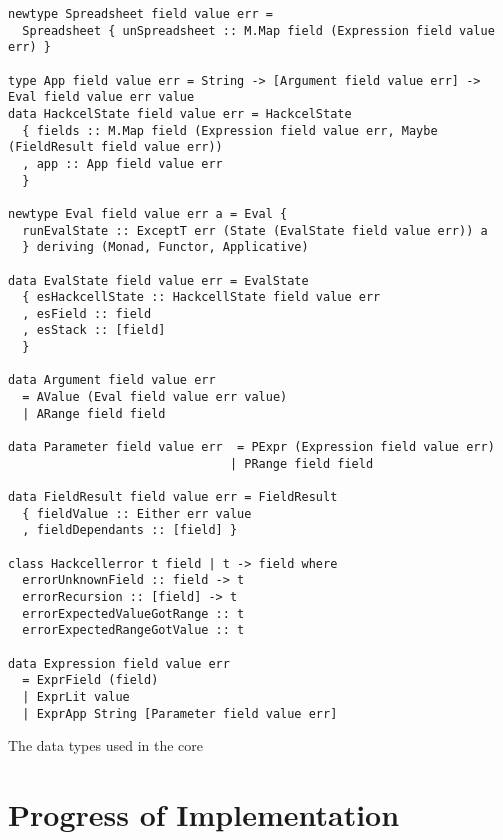 \documentclass{article}
\begin{document}
	\begin{listing}
	\begin{verbatim}
newtype Spreadsheet field value err =
  Spreadsheet { unSpreadsheet :: M.Map field (Expression field value err) }
     
type App field value err = String -> [Argument field value err] -> Eval field value err value
data HackcelState field value err = HackcelState
  { fields :: M.Map field (Expression field value err, Maybe (FieldResult field value err))
  , app :: App field value err
  }

newtype Eval field value err a = Eval {
  runEvalState :: ExceptT err (State (EvalState field value err)) a
  } deriving (Monad, Functor, Applicative)

data EvalState field value err = EvalState
  { esHackcellState :: HackcellState field value err
  , esField :: field
  , esStack :: [field]
  }

data Argument field value err
  = AValue (Eval field value err value)
  | ARange field field

data Parameter field value err  = PExpr (Expression field value err)
                               | PRange field field
                               
data FieldResult field value err = FieldResult
  { fieldValue :: Either err value
  , fieldDependants :: [field] }

class Hackcellerror t field | t -> field where
  errorUnknownField :: field -> t
  errorRecursion :: [field] -> t
  errorExpectedValueGotRange :: t
  errorExpectedRangeGotValue :: t

data Expression field value err
  = ExprField (field)
  | ExprLit value
  | ExprApp String [Parameter field value err]
	\end{verbatim}
	\caption{The data types used in the core}
	\label{listing:datatypes}
	\end{listing}
	\section{Progress of Implementation}
	
\end{document}
